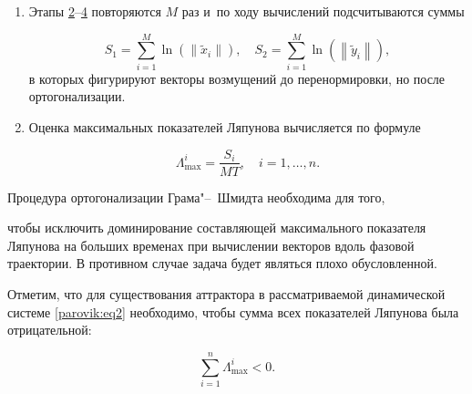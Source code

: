 \begin{enumerate}
\hypertarget{par:p5}{}

\item[5.] Этапы \hyperlink{par:p2}{2}--\hyperlink{par:p4}{4} повторяются $M$ раз и~по ходу вычислений подсчитываются суммы 

$$

{S_1} = \sum\limits_{i = 1}^M {\ln \left( {\left\| {{{\tilde x}_i}} \right\|} \right)}, \quad 

{S_2} = \sum\limits_{i = 1}^{M} {\ln \left( {\left\| {{{\tilde y}_i}} \right\|}\right)} ,

$$ в которых фигурируют векторы возмущений до перенормировки, но после ортогонализации.



\hypertarget{par:p6}{}

\item[6.] Оценка максимальных показателей Ляпунова вычисляется по формуле

\[

\Lambda _{\max }^i = \frac{{{S_i}}}{{MT}},\quad i = 1, \dots , n.

\]

\end{enumerate}



\begin{remark}

Процедура ортогонализации Грама"--~Шмидта необходима для того,

чтобы исключить доминирование составляющей максимального показателя Ляпунова на больших временах при вычислении векторов вдоль фазовой траектории. В противном случае задача будет являться плохо обусловленной.

\end{remark}



\smallskip



\begin{remark}

Отметим, что для существования аттрактора в рассматриваемой динамической системе \eqref{parovik:eq2} необходимо, чтобы сумма всех показателей Ляпунова была отрицательной: 



$$\sum_{i = 1}^n {\Lambda_{\max }^i}  < 0.$$

\end{remark}



\smallskip



